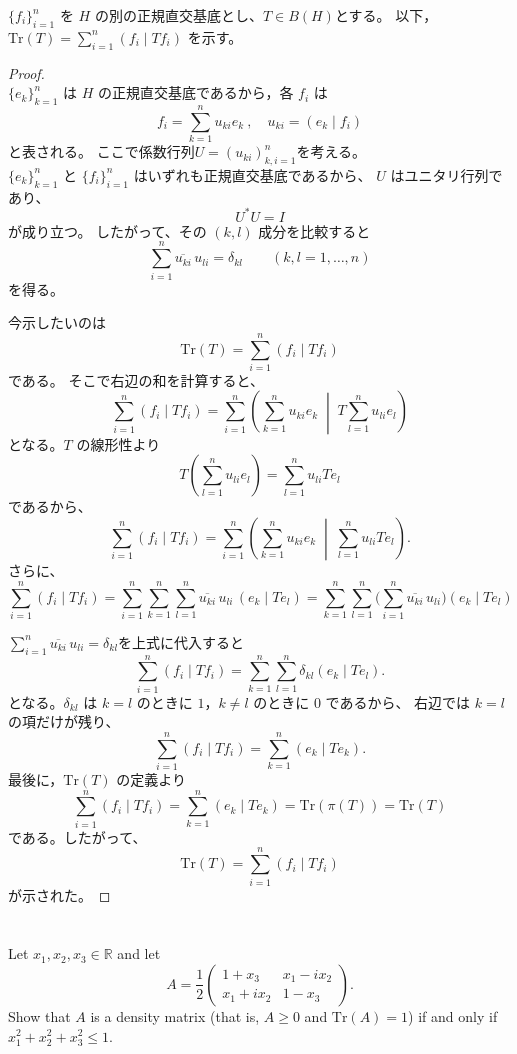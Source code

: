 \documentclass[dvipdfmx,a4paper]{jsarticle}
\theoremstyle{mystyle}
\begin{document}
\noindent
$\{f_i\}_{i=1}^{n}$ を $H$ の別の正規直交基底とし、$T\in B(H)$とする。
以下，$\mathrm{Tr}(T) = \sum_{i=1}^{n}(f_i \mid T f_i)$ を示す。\\

\begin{proof}\ \\
\noindent
$\{e_k\}_{k=1}^n$ は $H$ の正規直交基底であるから，各 $f_i$ は
\[
  f_i=\sum_{k=1}^n u_{ki}e_k\ ,
  \quad
  u_{ki}=(e_k\mid f_i)
\]
と表される。
ここで係数行列$U=(u_{ki})_{k,i=1}^n$を考える。\\
\noindent
$\{e_k\}_{k=1}^n$ と $\{f_i\}_{i=1}^n$ はいずれも正規直交基底であるから、
$U$ はユニタリ行列であり、
\[
  U^*U=I
\]
が成り立つ。
したがって、その $(k,l)$ 成分を比較すると
\[
  \sum_{i=1}^n \overline{u_{ki}}\,u_{li}=\delta_{kl}
  \qquad
  (k,l=1,\dots,n)
\]
を得る。

\medskip
\noindent
今示したいのは
\[
  \mathrm{Tr}(T)=\sum_{i=1}^n (f_i\mid Tf_i)
\]
である。
そこで右辺の和を計算すると、
\[
  \sum_{i=1}^n (f_i\mid Tf_i)
  =
  \sum_{i=1}^n
  \left(
    \sum_{k=1}^n u_{ki}e_k
    \;\middle|\;
    T\sum_{l=1}^n u_{li}e_l
  \right)
\]
となる。$T$ の線形性より
\[
  T\left(\sum_{l=1}^n u_{li}e_l\right)
  =
  \sum_{l=1}^n u_{li}Te_l
\]
であるから、
\[
  \sum_{i=1}^n (f_i\mid Tf_i)
  =
  \sum_{i=1}^n
  \left(
    \sum_{k=1}^n u_{ki}e_k
    \;\middle|\;
    \sum_{l=1}^n u_{li}Te_l
  \right).
\]
さらに、
\[
  \sum_{i=1}^n (f_i\mid Tf_i)
  =
  \sum_{i=1}^n \sum_{k=1}^n \sum_{l=1}^n
  \overline{u_{ki}}\,u_{li}\,(e_k\mid Te_l)
  =
  \sum_{k=1}^n \sum_{l=1}^n\bigl(\sum_{i=1}^n 
  \overline{u_{ki}}\,u_{li}\bigr)(e_k\mid Te_l)
\]

\medskip
$\sum_{i=1}^n \overline{u_{ki}}\,u_{li}=\delta_{kl}$を上式に代入すると
\[
  \sum_{i=1}^n (f_i\mid Tf_i)
  =
  \sum_{k=1}^n \sum_{l=1}^n \delta_{kl}(e_k\mid Te_l).
\]
となる。$\delta_{kl}$ は $k=l$ のときに $1$，$k\neq l$ のときに $0$ であるから、
右辺では $k=l$ の項だけが残り、
\[
  \sum_{i=1}^n (f_i\mid Tf_i)
  =
  \sum_{k=1}^n (e_k\mid Te_k).
\]
最後に，$\mathrm{Tr}(T)$ の定義より
\[
  \sum_{i=1}^n (f_i\mid Tf_i) = \sum_{k=1}^n (e_k\mid Te_k)=\mathrm{Tr}(\pi(T)) = \mathrm{Tr}(T)
\]
である。したがって、
\[
  \mathrm{Tr}(T)=\sum_{i=1}^n (f_i\mid Tf_i)
\]
が示された。
\end{proof}
\newpage
\section*{}
\noindent
\textrm{Let $x_1, x_2, x_3 \in \mathbb{R}$ and let
\[
  A = \frac{1}{2}
  \begin{pmatrix}
    1 + x_3 & x_1 - ix_2 \\
    x_1 + ix_2 & 1 - x_3
  \end{pmatrix}.
\]
Show that $A$ is a density matrix (that is, $A \geq 0$ and $\mathrm{Tr}(A) = 1$)
if and only if $x_1^2 + x_2^2 + x_3^2 \leq 1$.}
\end{document}
